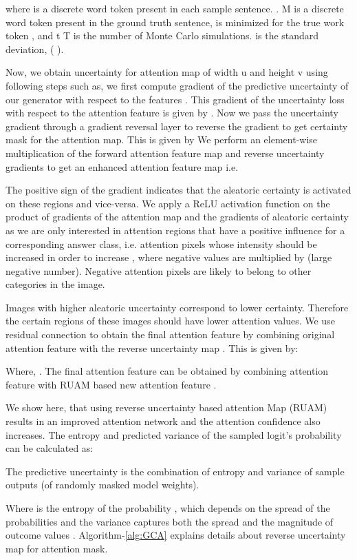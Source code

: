 \documentclass[review]{elsarticle}
\begin{document}
where  is a discrete word token present in each sample sentence.  . M is a discrete word token present in the ground truth sentence,  is minimized for the true work token , and t  T is the number  of  Monte  Carlo  simulations.  is the standard deviation, ( ). 

Now, we obtain uncertainty for attention map  of width u and height v using following steps such as, we first compute gradient of the predictive uncertainty  of our generator with respect to the features . This gradient of the uncertainty loss   with respect to the attention feature  is given by . Now we pass the uncertainty gradient through a gradient reversal layer to reverse the gradient to get certainty mask for the attention map. This is given by 
We perform an element-wise multiplication of the forward attention feature map and reverse uncertainty gradients to get an enhanced attention feature map i.e.

The positive sign of the gradient  indicates that the aleatoric certainty is activated on these regions and vice-versa. We apply a ReLU activation function on the product of gradients of the attention map and the gradients of aleatoric certainty as we are only interested in attention regions that have a positive influence for a corresponding  answer class, i.e. attention pixels whose intensity should be increased in order to increase , where negative values are multiplied by  (large negative number). Negative attention pixels are likely to belong to other categories in the image.  

Images with higher aleatoric uncertainty correspond to lower certainty. Therefore the certain regions of these images should have lower attention values.  We use residual connection to obtain the final attention feature by combining original attention feature with the reverse uncertainty map . This is given by:

Where, . The final attention feature  can be obtained by combining attention feature  with RUAM based new attention feature .

We show here, that using reverse uncertainty based attention Map (RUAM) results in an improved attention network and the attention confidence also increases. The entropy and predicted variance of the sampled logit's probability can be calculated as:

The predictive uncertainty is the combination of entropy and variance of  sample outputs (of randomly masked model weights).

Where  is the entropy of the probability , which depends on the spread of the probabilities and the variance captures both the spread and the magnitude of outcome values . Algorithm-\ref{alg:GCA} explains details about reverse uncertainty map for attention mask. 
\end{document}
